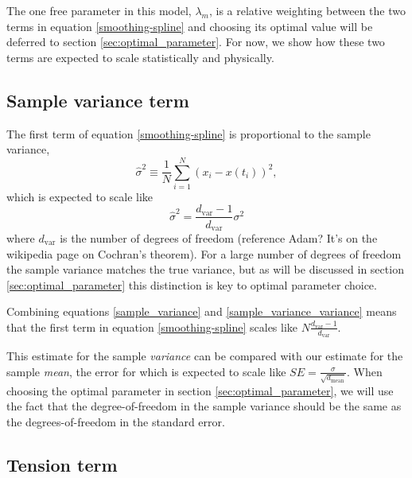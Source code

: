 \documentclass[10pt,journal]{IEEEtran}
\begin{document}
The one free parameter in this model, $\lambda_m$, is a relative weighting between the two terms in equation \ref{smoothing-spline} and choosing its optimal value will be deferred to section \ref{sec:optimal_parameter}. For now, we show how these two terms are expected to scale statistically and physically.

\subsection{Sample variance term}
\label{sec:sample_variance}

The first term of equation \ref{smoothing-spline} is proportional to the sample variance,
\begin{equation}
\label{sample_variance}
\hat{\sigma}^2  \equiv \frac{1}{N} \sum_{i=1}^{N} \left( x_i - x(t_i) \right) ^2,
\end{equation}
which is expected to scale like
\begin{equation}
\label{sample_variance_variance}
\hat{\sigma}^2 = \frac{d_{\textrm{var}}-1}{d_{\textrm{var}}} \sigma^2
\end{equation}
where $d_{\textrm{var}}$ is the number of degrees of freedom (reference Adam? It's on the wikipedia page on Cochran's theorem). For a large number of degrees of freedom the sample variance matches the true variance, but as will be discussed in section \ref{sec:optimal_parameter} this distinction is key to optimal parameter choice.

Combining equations \ref{sample_variance} and \ref{sample_variance_variance} means that the first term in equation \ref{smoothing-spline} scales like $N \frac{d_{\textrm{var}}-1}{d_{\textrm{var}}}$.

This estimate for the sample \emph{variance} can be compared with our estimate for the sample \emph{mean}, the error for which is expected to scale like $SE = \frac{\sigma}{\sqrt{d_{\textrm{mean}}}}$. When choosing the optimal parameter in section \ref{sec:optimal_parameter}, we will use the fact that the degree-of-freedom in the sample variance should be the same as the degrees-of-freedom in the standard error.

\subsection{Tension term}
\end{document}
